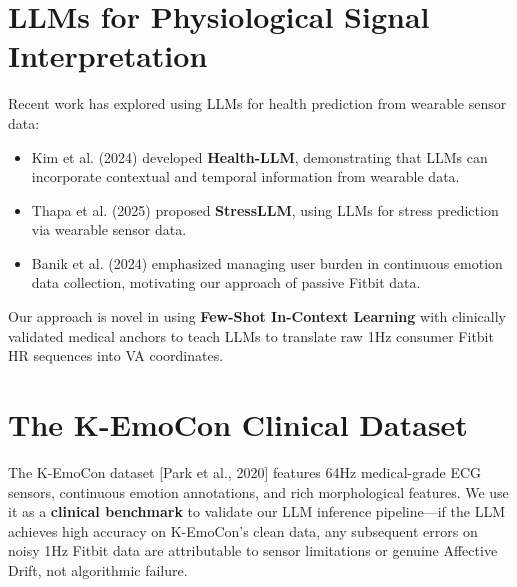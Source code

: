 \documentclass[11pt, a4paper]{report}
\begin{document}
\section{LLMs for Physiological Signal Interpretation}
Recent work has explored using LLMs for health prediction from wearable sensor data:
\begin{itemize}
    \item Kim et al. (2024) developed \textbf{Health-LLM}, demonstrating that LLMs can incorporate contextual and temporal information from wearable data.
    \item Thapa et al. (2025) proposed \textbf{StressLLM}, using LLMs for stress prediction via wearable sensor data.
    \item Banik et al. (2024) emphasized managing user burden in continuous emotion data collection, motivating our approach of passive Fitbit data.
\end{itemize}
Our approach is novel in using \textbf{Few-Shot In-Context Learning} with clinically validated medical anchors to teach LLMs to translate raw 1Hz consumer Fitbit HR sequences into VA coordinates.

\section{The K-EmoCon Clinical Dataset}
The K-EmoCon dataset [Park et al., 2020] features 64Hz medical-grade ECG sensors, continuous emotion annotations, and rich morphological features. We use it as a \textbf{clinical benchmark} to validate our LLM inference pipeline---if the LLM achieves high accuracy on K-EmoCon's clean data, any subsequent errors on noisy 1Hz Fitbit data are attributable to sensor limitations or genuine Affective Drift, not algorithmic failure.
\end{document}
